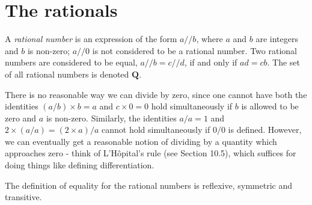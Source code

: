 \section{The rationals}\label{sec 4.2}

\begin{definition}\label{4.2.1}
    A \emph{rational number} is an expression of the form \(a // b\), where \(a\) and \(b\) are integers and \(b\) is non-zero;
    \(a // 0\) is not considered to be a rational number.
    Two rational numbers are considered to be equal, \(a // b = c // d\), if and only if \(ad = cb\).
    The set of all rational numbers is denoted \(\mathbf{Q}\).
\end{definition}

\begin{note}
    There is no reasonable way we can divide by zero, since one cannot have both the identities \((a / b) \times b = a\) and \(c \times 0 = 0\) hold simultaneously if \(b\) is allowed to be zero and \(a\) is non-zero.
    Similarly, the identities \(a / a = 1\) and \(2 \times (a / a) = (2 \times a) / a\) cannot hold simultaneously if \(0 / 0\) is defined.
    However, we can eventually get a reasonable notion of dividing by a quantity which approaches zero
    - think of L'H\^opital's rule (see Section 10.5), which suffices for doing things like defining differentiation.
\end{note}

\begin{additional corollary}\label{ac 4.2.1}
The definition of equality for the rational numbers is reflexive, symmetric and transitive.
\end{additional corollary}

